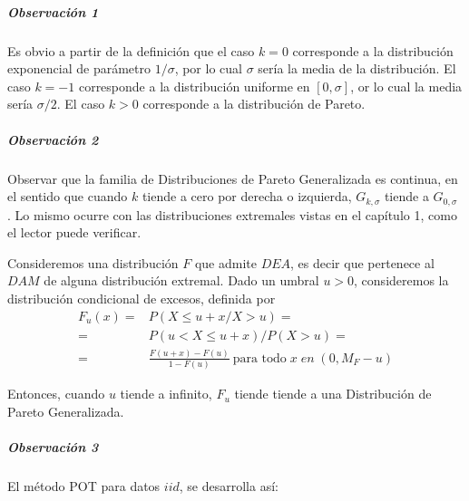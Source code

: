 \documentclass[
  12pt]{article}
\begin{document}
\subparagraph{Observación 1}\label{observaciuxf3n-1}

Es obvio a partir de la definición que el caso \(k=0\) corresponde a la
distribución exponencial de parámetro \(1/\sigma\), por lo cual
\(\sigma\) sería la media de la distribución. El caso \(k=-1\)
corresponde a la distribución uniforme en \([0, \sigma]\), or lo cual la
media sería \(\sigma/2\). El caso \(k>0\) corresponde a la distribución
de Pareto.

\subparagraph{Observación 2}\label{observaciuxf3n-2}

Observar que la familia de Distribuciones de Pareto Generalizada es
continua, en el sentido que cuando \(k\) tiende a cero por derecha o
izquierda, \(G_{k,\sigma}\) tiende a \(G_{0,\sigma}\) . Lo mismo ocurre
con las distribuciones extremales vistas en el capítulo 1, como el
lector puede verificar.

\begin{theorem}
Consideremos una distribución $F$ que admite $DEA$, es decir que pertenece al $DAM$ de alguna distribución extremal. Dado un umbral $u>0$, consideremos la distribución condicional de excesos, definida por
\begin{align}
F_u(x)= &P(X \leq  u+x/ X>u)= \nonumber \\
=&P(u<X \leq u+x)/P(X>u)= \nonumber \\
=&\frac{F(u+x)-F(u)}{1-F(u)}\:\text{para todo}\; x\; en\;(0,M_{F}-u)
\end{align}
\end{theorem}

Entonces, cuando \(u\) tiende a infinito, \(F_u\) tiende tiende a una
Distribución de Pareto Generalizada.

\subparagraph{Observación 3}\label{observaciuxf3n-3}

El método POT para datos \(iid\), se desarrolla así:
\end{document}
